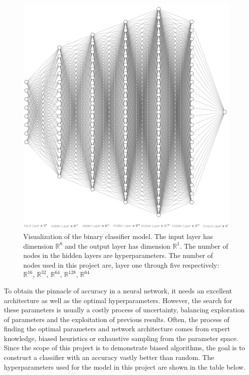 \documentclass[11pt, fleqn, titlepage]{article}
\begin{document}
	\begin{figure}[H]
		\centering
		\includegraphics[scale=0.8]{imgs/ffnn}
		\caption{Visualization of the binary classifier model. The input layer has dimension $ \mathbb R ^8$ and the output layer has dimension $ \mathbb R^1 $. The number of nodes in the hidden layers are hyperparameters. The number of nodes used in this project are, layer one through five respectively: $ \mathbb R ^{16} $, $ \mathbb R ^{32} $, $ \mathbb R ^{64} $, $ \mathbb R ^{128} $, $ \mathbb R ^{64} $}
		\label{fig:ffnn}
	\end{figure}
		
	\noindent 
	To obtain the pinnacle of accuracy in a neural network, it needs an excellent architecture as well as the optimal hyperparameters. However, the search for these parameters is usually a costly process of uncertainty, balancing exploration of parameters and the exploitation of previous results. Often, the process of finding the optimal parameters and network architecture comes from expert knowledge, biased heuristics or exhaustive sampling from the parameter space. Since the scope of this project is to demonstrate biased algorithms, the goal is to construct a classifier with an accuracy vastly better than random. The hyperparameters used for the model in this project are shown in the table below.
	
\end{document}
